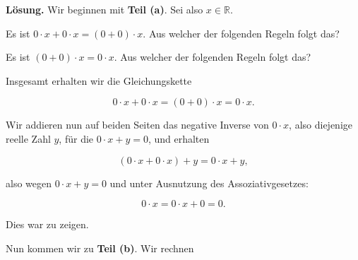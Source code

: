 \documentclass{ximera}
\begin{document}
\textbf{Lösung.}
Wir beginnen mit \textbf{Teil (a)}. Sei also $x\in\mathbb R$.

\begin{question}
Es ist $0\cdot x + 0\cdot x = (0+0)\cdot x$. Aus welcher der folgenden Regeln folgt das?
\begin{solution}
\begin{multiple-choice}[4]
\end{multiple-choice}
\end{solution}
\end{question}

\begin{question}
Es ist $(0+0)\cdot x = 0\cdot x$. Aus welcher der folgenden Regeln folgt das?
\begin{solution}
\begin{multiple-choice}[4]
\end{multiple-choice}
\end{solution}
\end{question}


Insgesamt erhalten wir die Gleichungskette

\[
0\cdot x + 0\cdot x = (0+0)\cdot x = 0\cdot x.
\]

Wir addieren nun auf beiden Seiten das negative Inverse von $0\cdot x$, also diejenige reelle Zahl $y$, für die $0\cdot x + y  = 0$, und erhalten

\[
(0\cdot x + 0\cdot x) + y = 0\cdot x+ y,
\]

also wegen $0\cdot x + y  = 0$ und unter Ausnutzung des Assoziativgesetzes:

\[
0\cdot x = 0\cdot x + 0 = 0.
\]

Dies war zu zeigen.


Nun kommen wir zu \textbf{Teil (b)}.
Wir rechnen
\end{document}
